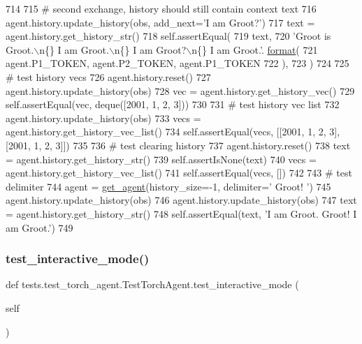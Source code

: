 \begin{DoxyCode}
714 
715         \textcolor{comment}{# second exchange, history should still contain context text}
716         agent.history.update\_history(obs, add\_next=\textcolor{stringliteral}{'I am Groot?'})
717         text = agent.history.get\_history\_str()
718         self.assertEqual(
719             text,
720             \textcolor{stringliteral}{'Groot is Groot.\(\backslash\)n\{\} I am Groot.\(\backslash\)n\{\} I am Groot?\(\backslash\)n\{\} I am Groot.'}.
      \hyperlink{namespaceparlai_1_1chat__service_1_1services_1_1messenger_1_1shared__utils_a32e2e2022b824fbaf80c747160b52a76}{format}(
721                 agent.P1\_TOKEN, agent.P2\_TOKEN, agent.P1\_TOKEN
722             ),
723         )
724 
725         \textcolor{comment}{# test history vecs}
726         agent.history.reset()
727         agent.history.update\_history(obs)
728         vec = agent.history.get\_history\_vec()
729         self.assertEqual(vec, deque([2001, 1, 2, 3]))
730 
731         \textcolor{comment}{# test history vec list}
732         agent.history.update\_history(obs)
733         vecs = agent.history.get\_history\_vec\_list()
734         self.assertEqual(vecs, [[2001, 1, 2, 3], [2001, 1, 2, 3]])
735 
736         \textcolor{comment}{# test clearing history}
737         agent.history.reset()
738         text = agent.history.get\_history\_str()
739         self.assertIsNone(text)
740         vecs = agent.history.get\_history\_vec\_list()
741         self.assertEqual(vecs, [])
742 
743         \textcolor{comment}{# test delimiter}
744         agent = \hyperlink{namespacetests_1_1test__torch__agent_ae929d109305aaea29fbfa13ecf1f32e9}{get\_agent}(history\_size=-1, delimiter=\textcolor{stringliteral}{' Groot! '})
745         agent.history.update\_history(obs)
746         agent.history.update\_history(obs)
747         text = agent.history.get\_history\_str()
748         self.assertEqual(text, \textcolor{stringliteral}{'I am Groot. Groot! I am Groot.'})
749 
\end{DoxyCode}
\mbox{\label{classtests_1_1test__torch__agent_1_1TestTorchAgent_aadf263b222e27bfd83d568148683a8e0}} 
\subsubsection{\texorpdfstring{test\+\_\+interactive\+\_\+mode()}{test\_interactive\_mode()}}
{\footnotesize\ttfamily def tests.\+test\+\_\+torch\+\_\+agent.\+Test\+Torch\+Agent.\+test\+\_\+interactive\+\_\+mode (\begin{DoxyParamCaption}\item[{}]{self }\end{DoxyParamCaption})}


